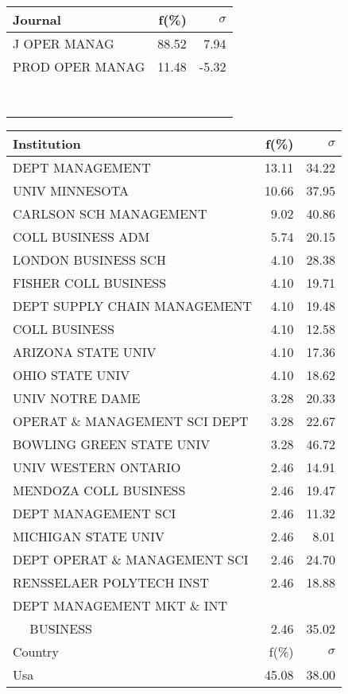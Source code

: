\documentclass[a4paper,11pt]{report}
\begin{document}
\begin{landscape}
\begin{table}[!ht]
{\begin{tabular}{|l r r|}
\hline
\hline
Journal & f(\%) & $\sigma$\\
\hline
J OPER MANAG & 88.52 & 7.94\\
PROD OPER MANAG & 11.48 & -5.32\\
 &  & \\
 &  & \\
 &  & \\
 &  & \\
 &  & \\
 &  & \\
 &  & \\
 &  & \\
\hline
\end{tabular}
}
{\scriptsize\begin{tabular}{|l r r|}
\hline
Institution & f(\%) & $\sigma$\\
\hline
DEPT MANAGEMENT & 13.11 & 34.22\\
UNIV MINNESOTA & 10.66 & 37.95\\
CARLSON SCH MANAGEMENT & 9.02 & 40.86\\
COLL BUSINESS ADM & 5.74 & 20.15\\
LONDON BUSINESS SCH & 4.10 & 28.38\\
FISHER COLL BUSINESS & 4.10 & 19.71\\
DEPT SUPPLY CHAIN MANAGEMENT & 4.10 & 19.48\\
COLL BUSINESS & 4.10 & 12.58\\
ARIZONA STATE UNIV & 4.10 & 17.36\\
OHIO STATE UNIV & 4.10 & 18.62\\
UNIV NOTRE DAME & 3.28 & 20.33\\
OPERAT \& MANAGEMENT SCI DEPT & 3.28 & 22.67\\
BOWLING GREEN STATE UNIV & 3.28 & 46.72\\
UNIV WESTERN ONTARIO & 2.46 & 14.91\\
MENDOZA COLL BUSINESS & 2.46 & 19.47\\
DEPT MANAGEMENT SCI & 2.46 & 11.32\\
MICHIGAN STATE UNIV & 2.46 & 8.01\\
DEPT OPERAT \& MANAGEMENT SCI & 2.46 & 24.70\\
RENSSELAER POLYTECH INST & 2.46 & 18.88\\
DEPT MANAGEMENT MKT \& INT &  & \\
$\quad$ BUSINESS & 2.46 & 35.02\\
\hline
\hline
Country & f(\%) & $\sigma$\\
\hline
Usa & 45.08 & 38.00\\

\end{tabular}}
\end{table}
\end{landscape}
\end{document}
